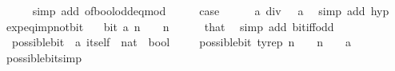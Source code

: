 \begin{isabellebody}
\ \ \ \ \isamarkupfalse%
\ {\isacharparenleft}{\kern0pt}simp\ add{\isacharcolon}{\kern0pt}\ of{\isacharunderscore}{\kern0pt}bool{\isacharunderscore}{\kern0pt}odd{\isacharunderscore}{\kern0pt}eq{\isacharunderscore}{\kern0pt}mod{\isacharunderscore}{\kern0pt}{}{\isacharparenright}{\kern0pt}\isanewline
\ \ \isamarkupfalse%
\ \isamarkupfalse%
\ {\isacharquery}{\kern0pt}case\isanewline
\ \ \ \ \isamarkupfalse%
\ {\isacartoucheopen}a\ div\ {}\ {\isacharequal}{\kern0pt}\ a{\isacartoucheclose}\ \isamarkupfalse%
\ {\isacharparenleft}{\kern0pt}simp\ add{\isacharcolon}{\kern0pt}\ hyp{\isacharparenright}{\kern0pt}\isanewline
{}\isamarkupfalse%
%
\endisatagproof
{\isafoldproof}%
%
\isadelimproof
\isanewline
%
\endisadelimproof
\isanewline
{}\isamarkupfalse%
\ exp{\isacharunderscore}{\kern0pt}eq{\isacharunderscore}{\kern0pt}{}{\isacharunderscore}{\kern0pt}imp{\isacharunderscore}{\kern0pt}not{\isacharunderscore}{\kern0pt}bit{\isacharcolon}{\kern0pt}\isanewline
\ \ {\isacartoucheopen}{\isasymnot}\ bit\ a\ n{\isacartoucheclose}\ \ {\isacartoucheopen}{}\ {\isacharcircum}{\kern0pt}\ n\ {\isacharequal}{\kern0pt}\ {}{\isacartoucheclose}\isanewline
%
\isadelimproof
\ \ %
\endisadelimproof
%
\isatagproof
{}\isamarkupfalse%
\ that\ \isamarkupfalse%
\ {\isacharparenleft}{\kern0pt}simp\ add{\isacharcolon}{\kern0pt}\ bit{\isacharunderscore}{\kern0pt}iff{\isacharunderscore}{\kern0pt}odd{\isacharparenright}{\kern0pt}%
\endisatagproof
{\isafoldproof}%
%
\isadelimproof
\isanewline
%
\endisadelimproof
\isanewline
{}\isamarkupfalse%
\isanewline
\ \ possible{\isacharunderscore}{\kern0pt}bit\ {\isacharcolon}{\kern0pt}{\isacharcolon}{\kern0pt}\ {\isachardoublequoteopen}{\isacharprime}{\kern0pt}a\ itself\ {\isasymRightarrow}\ nat\ {\isasymRightarrow}\ bool{\isachardoublequoteclose}\isanewline
\ \ \isanewline
\ \ {\isachardoublequoteopen}possible{\isacharunderscore}{\kern0pt}bit\ tyrep\ n\ {\isacharequal}{\kern0pt}\ {\isacharparenleft}{\kern0pt}{}\ {\isacharcircum}{\kern0pt}\ n\ {\isasymnoteq}\ {\isacharparenleft}{\kern0pt}{}\ {\isacharcolon}{\kern0pt}{\isacharcolon}{\kern0pt}\ {\isacharprime}{\kern0pt}a{\isacharparenright}{\kern0pt}{\isacharparenright}{\kern0pt}{\isachardoublequoteclose}\isanewline
\isanewline
{}\isamarkupfalse%
\ possible{\isacharunderscore}{\kern0pt}bit{\isacharunderscore}{\kern0pt}{}{\isacharbrackleft}{\kern0pt}simp{\isacharbrackright}{\kern0pt}{\isacharcolon}{\kern0pt}\isanewline

\end{isabellebody}
